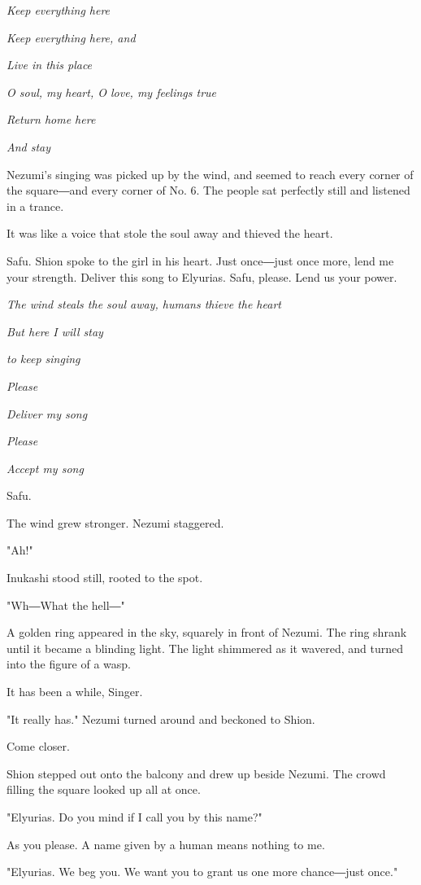 \emph{Keep everything here}

\emph{Keep everything here, and}

\emph{Live in this place}

\emph{O soul, my heart, O love, my feelings true}

\emph{Return home here}

\emph{And stay}

Nezumi's singing was picked up by the wind, and seemed to reach every
corner of the square―and every corner of No. 6. The people sat perfectly
still and listened in a trance.

It was like a voice that stole the soul away and thieved the heart.

Safu. Shion spoke to the girl in his heart. Just once―just once more,
lend me your strength. Deliver this song to Elyurias. Safu, please. Lend
us your power.

\emph{The wind steals the soul away, humans thieve the heart}

\emph{But here I will stay}

\emph{to keep singing}

\emph{Please}

\emph{Deliver my song}

\emph{Please}

\emph{Accept my song}

Safu.

The wind grew stronger. Nezumi staggered.

"Ah!"

Inukashi stood still, rooted to the spot.

"Wh―What the hell―"

A golden ring appeared in the sky, squarely in front of Nezumi. The ring
shrank until it became a blinding light. The light shimmered as it
wavered, and turned into the figure of a wasp.

It has been a while, Singer.

"It really has." Nezumi turned around and beckoned to Shion.

Come closer.

Shion stepped out onto the balcony and drew up beside Nezumi. The crowd
filling the square looked up all at once.

"Elyurias. Do you mind if I call you by this name?"

As you please. A name given by a human means nothing to me.

"Elyurias. We beg you. We want you to grant us one more chance―just
once."

